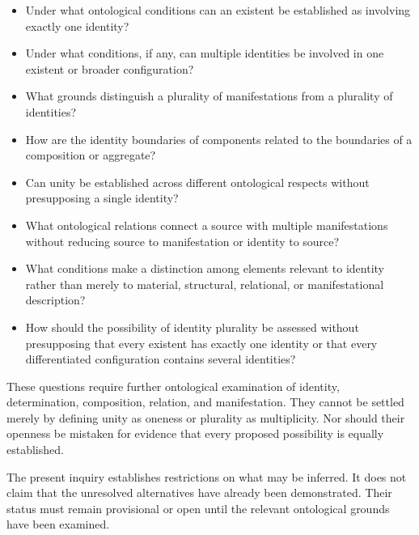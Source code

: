 \begin{itemize}
    \item Under what ontological conditions can
    an existent be established as involving
    exactly one identity?

    \item Under what conditions, if any, can
    multiple identities be involved in one
    existent or broader configuration?

    \item What grounds distinguish a plurality
    of manifestations from a plurality of identities?

    \item How are the identity boundaries of
    components related to the boundaries of
    a composition or aggregate?

    \item Can unity be established across
    different ontological respects without
    presupposing a single identity?

    \item What ontological relations connect
    a source with multiple manifestations
    without reducing source to manifestation
    or identity to source?

    \item What conditions make a distinction
    among elements relevant to identity rather
    than merely to material, structural,
    relational, or manifestational description?

    \item How should the possibility of identity
    plurality be assessed without presupposing
    that every existent has exactly one identity
    or that every differentiated configuration
    contains several identities?
\end{itemize}

These questions require further ontological
examination of identity, determination,
composition, relation, and manifestation.
They cannot be settled merely by defining
unity as oneness or plurality as multiplicity.
Nor should their openness be mistaken for
evidence that every proposed possibility
is equally established.

The present inquiry establishes restrictions
on what may be inferred. It does not claim
that the unresolved alternatives have already
been demonstrated. Their status must remain
provisional or open until the relevant
ontological grounds have been examined.

